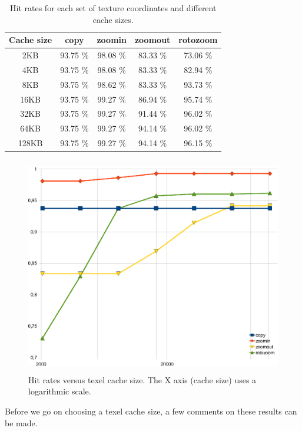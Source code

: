 \documentclass[a4paper,11pt]{kthesis}
\begin{document}
\begin{table}
\centering
\begin{tabular}{|c|c|c|c|c|}
\hline
\textbf{Cache size} & \textbf{copy} & \textbf{zoomin} & \textbf{zoomout} & \textbf{rotozoom} \\
\hline
2KB & 93.75 \% & 98.08 \% & 83.33 \% & 73.06 \% \\
\hline
4KB & 93.75 \% & 98.08 \% & 83.33 \% & 82.94 \% \\
\hline
8KB & 93.75 \% & 98.62 \% & 83.33 \% & 93.73 \% \\
\hline
16KB & 93.75 \% & 99.27 \% & 86.94 \% & 95.74 \% \\
\hline
32KB & 93.75 \% & 99.27 \% & 91.44 \% & 96.02 \% \\
\hline
64KB & 93.75 \% & 99.27 \% & 94.14 \% & 96.02 \% \\
\hline
128KB & 93.75 \% & 99.27 \% & 94.14 \% & 96.15 \% \\
\hline
\end{tabular}
\caption{Hit rates for each set of texture coordinates and different cache sizes.}\label{tab:tcresults}
\end{table}

\begin{figure}[htp]
\centering
\includegraphics[height=95mm]{tcresultsgraph.eps}
\caption{Hit rates versus texel cache size. The X axis (cache size) uses a logarithmic scale.}
\label{fig:tcresultsgraph}
\end{figure}

Before we go on choosing a texel cache size, a few comments on these results can be made.
\end{document}

